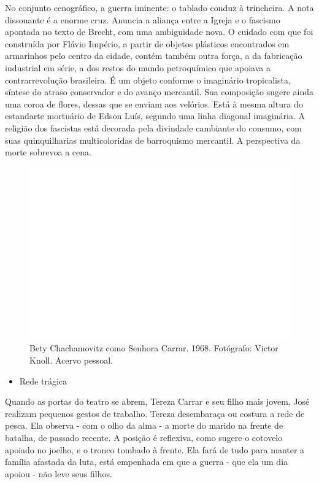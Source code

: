 No conjunto cenográfico, a guerra iminente: o tablado conduz à
trincheira. A nota dissonante é a enorme cruz. Anuncia a aliança entre a
Igreja e o fascismo apontada no texto de Brecht, com uma ambiguidade
nova. O cuidado com que foi construída por Flávio Império, a partir de
objetos plásticos encontrados em armarinhos pelo centro da cidade,
contém também outra força, a da fabricação industrial em série, a dos
restos do mundo petroquímico que apoiava a contrarrevolução brasileira.
É um objeto conforme o imaginário tropicalista, síntese do atraso
conservador e do avanço mercantil. Sua composição sugere ainda uma coroa
de flores, dessas que se enviam aos velórios. Está à mesma altura do
estandarte mortuário de Edson Luís, segundo uma linha diagonal
imaginária. A religião dos fascistas está decorada pela divindade
cambiante do consumo, com suas quinquilharias multicoloridas de
barroquismo mercantil. A perspectiva da morte sobrevoa a cena.

\begin{figure}
\includegraphics[width=\columnwidth]{./media/IMAGEM25.png}
\caption{Bety Chachamovitz como Senhora Carrar. 1968. Fotógrafo: Victor Knoll.
Acervo pessoal.}
\end{figure}

\begin{itemize}
\item
  Rede trágica
\end{itemize}

Quando as portas do teatro se abrem, Tereza Carrar e seu filho mais
jovem, José realizam pequenos gestos de trabalho. Tereza desembaraça ou
costura a rede de pesca. Ela observa - com o olho da alma - a morte do
marido na frente de batalha, de passado recente. A posição é reflexiva,
como sugere o cotovelo apoiado no joelho, e o tronco tombado à frente.
Ela fará de tudo para manter a família afastada da luta, está empenhada
em que a guerra - que ela um dia apoiou - não leve seus filhos.

